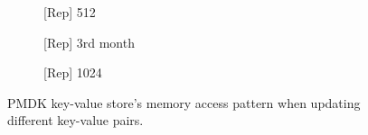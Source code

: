 \begin{figure}[t]
\begin{subfigure}[b]{.24\linewidth}
        \caption{[Rep] 512}
        \label{fig:14:rep:pmdk-kv-memory-pattern2}
    \end{subfigure}
    \hfill
    \begin{subfigure}[b]{.24\linewidth}
        \centering
        \caption{[Rep] 3rd month}
        \label{fig:14:rep:pmdk-kv-memory-pattern3}
    \end{subfigure}
    \hfill
    \begin{subfigure}[b]{.24\linewidth}
        \centering
        \caption{[Rep] 1024}
        \label{fig:14:rep:pmdk-kv-memory-pattern4}
    \end{subfigure}
    \caption{PMDK key-value store's memory access pattern when updating different key-value pairs.}
    \label{fig:14:pmdk-kv-memory-pattern-feature}

\end{figure}
